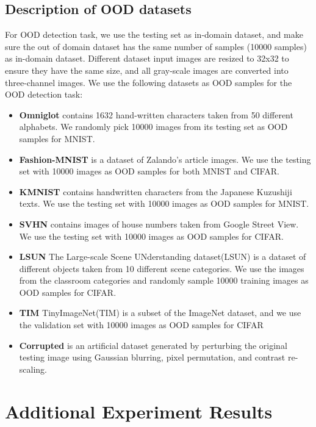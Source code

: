 \subsection{Description of OOD datasets} \label{ood-dataset-appendix}
For OOD detection task, we use the testing set as in-domain dataset, and make sure the out of domain dataset has the same number of samples (10000 samples) as in-domain dataset. Different dataset input images are resized to 32x32 to ensure they have the same size, and all gray-scale images are converted into three-channel images. We use the following datasets as OOD samples for the OOD detection task:
\begin{itemize}
    \item \textbf{Omniglot} contains 1632 hand-written characters taken from 50 different alphabets. We randomly pick 10000 images from its testing set as OOD samples for MNIST.
    \item \textbf{Fashion-MNIST} is a dataset of Zalando's article images. We use the testing set with 10000 images as OOD samples for both MNIST and CIFAR.
    \item \textbf{KMNIST} contains handwritten characters from the Japanese Kuzushiji texts. We use the testing set with 10000 images as OOD samples for MNIST.
    \item \textbf{SVHN} contains images of house numbers taken from Google Street View. We use the testing set with 10000 images as OOD samples for CIFAR.
    \item \textbf{LSUN} The Large-scale Scene UNderstanding dataset(LSUN) is a dataset of different objects taken from 10 different scene categories. We use the images from the classroom categories and randomly sample 10000 training images as OOD samples for CIFAR.
    \item \textbf{TIM} TinyImageNet(TIM) is a subset of the ImageNet dataset, and we use the validation set with 10000 images as OOD samples for CIFAR
    \item \textbf{Corrupted} is an artificial dataset generated by perturbing the original testing image using Gaussian blurring, pixel permutation, and contrast re-scaling.
\end{itemize}

\section{Additional Experiment Results} \label{results-appendix}
